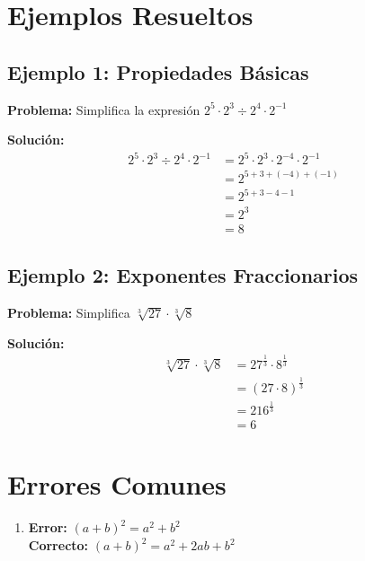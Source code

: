 \begin{teoria}

\section{Ejemplos Resueltos}

\subsection{Ejemplo 1: Propiedades Básicas}

\textbf{Problema:} Simplifica la expresión $2^5 \cdot 2^3 \div 2^4 \cdot 2^{-1}$

\textbf{Solución:}
\begin{align*}
2^5 \cdot 2^3 \div 2^4 \cdot 2^{-1} &= 2^5 \cdot 2^3 \cdot 2^{-4} \cdot 2^{-1} \\
&= 2^{5+3+(-4)+(-1)} \\
&= 2^{5+3-4-1} \\
&= 2^3 \\
&= 8
\end{align*}

\subsection{Ejemplo 2: Exponentes Fraccionarios}

\textbf{Problema:} Simplifica $\sqrt[3]{27} \cdot \sqrt[3]{8}$

\textbf{Solución:}
\begin{align*}
\sqrt[3]{27} \cdot \sqrt[3]{8} &= 27^{\frac{1}{3}} \cdot 8^{\frac{1}{3}} \\
&= (27 \cdot 8)^{\frac{1}{3}} \\
&= 216^{\frac{1}{3}} \\
&= 6
\end{align*}


\section{Errores Comunes}

\begin{enumerate}
\item \textbf{Error:} $(a+b)^2 = a^2 + b^2$\\
\textbf{Correcto:} $(a+b)^2 = a^2 + 2ab + b^2$


\end{enumerate}
\end{teoria}
